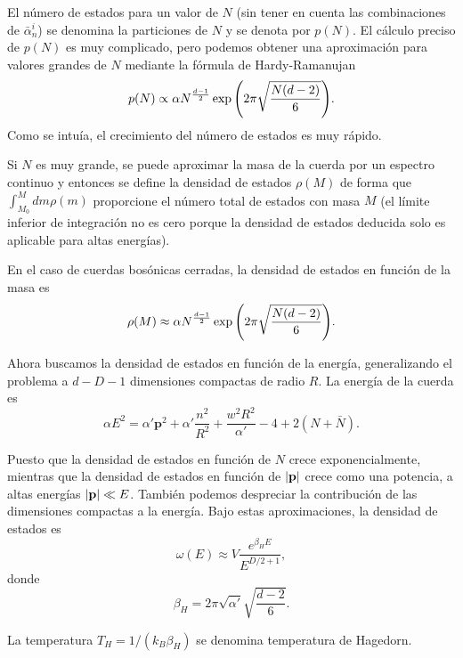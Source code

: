 El número de estados para un valor de $N$ (sin tener en cuenta las combinaciones de $\bar \alpha^i_n$) se denomina la particiones de $N$ 
y se denota por $p(N)$.
El cálculo preciso de $p(N)$ es muy complicado, pero podemos obtener una aproximación para
valores grandes de $N$ mediante la fórmula de Hardy-Ramanujan
\begin{equation}
  p(N)\propto \alpha N^ {\frac{d-1}{2}}\exp\qty(2\pi\sqrt{\frac{N(d-2)}{6}}).
\end{equation}
Como se intuía, el crecimiento del número de estados es muy rápido.

Si $N$ es muy grande, se puede aproximar la masa de la cuerda por un espectro continuo y entonces se define la
densidad de estados $\rho(M)$ de forma que $\int_{M_0}^M dm \rho(m)$ proporcione el número total
de estados con masa $M$ (el límite inferior de integración no es cero porque la densidad de estados deducida
solo es aplicable para altas energías).

En el caso de cuerdas bosónicas cerradas, la densidad de estados en función de la masa es
\begin{equation}
  \rho(M)\approx \alpha N^ {\frac{d-1}{2}}\exp\qty(2\pi\sqrt{\frac{N(d-2)}{6}}).
\end{equation}

Ahora buscamos la densidad de estados en función de la energía, generalizando el problema a $d-D-1$ dimensiones compactas 
de radio $R$.
La energía de la cuerda es
\begin{equation}
  \alpha E^2 = \alpha' \mathbf p ^2 + \alpha'\frac{n^2}{R^2} + \frac{w^2 R^2}{\alpha'} -4+ 2(N+\bar N).
\end{equation}

Puesto que la densidad de estados en función de $N$ crece exponencialmente, mientras 
que la densidad de estados en función de $\abs{\mathbf p}$ crece como una potencia,
a altas energías $\abs{\mathbf p} \ll E$.
También podemos despreciar la contribución de las dimensiones compactas a la energía.
Bajo estas aproximaciones, la densidad de estados es
\begin{equation}
  \omega(E) \approx V \frac{e^{\beta_H E}}{E^{D/2+1}},
\end{equation}
donde 
\begin{equation}
  \beta_H = 2\pi \sqrt{\alpha'}\sqrt{\frac{d-2}{6}}.
\end{equation}

La temperatura $T_H=1/(k_B \beta_H)$ se denomina temperatura de Hagedorn.


